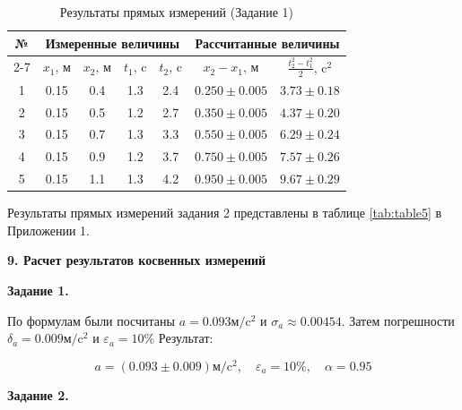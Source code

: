 \documentclass[14pt]{extreport}
\begin{document}
\begin{table}[H]
\centering
\caption{Результаты прямых измерений (Задание 1)}
\label{tab:table3}
\begin{tabular}{|c|c|c|c|c|c|c|}
\hline
№ & \multicolumn{4}{c|}{Измеренные величины} & \multicolumn{2}{c|}{Рассчитанные величины} \\
\cline{2-7} 
& \(x_1, \, \text{м}\) & \(x_2, \, \text{м}\) & \(t_1, \, \text{c}\) & \(t_2, \, \text{c}\) & \(x_2 - x_1, \, \text{м}\) & \(\frac{t_2^2 - t_1^2}{2}, \, \text{c}^2\) \\ \hline
1 & 0.15 & 0.4 & 1.3 & 2.4 & $0.250 \pm 0.005$ & $3.73 \pm 0.18$ \\ \hline
2 & 0.15 & 0.5 & 1.2 & 2.7 & $0.350 \pm 0.005$ & $4.37 \pm 0.20$ \\ \hline
3 & 0.15 & 0.7 & 1.3 & 3.3 & $0.550 \pm 0.005$ & $6.29 \pm 0.24$ \\ \hline
4 & 0.15 & 0.9 & 1.2 & 3.7 & $0.750 \pm 0.005$ & $7.57 \pm 0.26$ \\ \hline
5 & 0.15 & 1.1 & 1.3 & 4.2 & $0.950 \pm 0.005$ & $9.67 \pm 0.29$ \\ \hline

\end{tabular}
\end{table}

Результаты прямых измерений задания 2 представлены в таблице \ref{tab:table5} в Приложении 1.

\noindent\textbf{9. Расчет результатов косвенных измерений} 

\textbf{Задание 1.}

По формулам были посчитаны $a = 0.093\text{м}/\text{c}^2$ и $\sigma_a \approx 0.00454$.
Затем погрешности $\delta_a = 0.009\text{м}/\text{c}^2$ и $\varepsilon_a = 10\%$ Результат:

\begin{equation*}
a = (0.093 \pm 0.009)\text{м}/\text{c}^2, \quad \varepsilon_a = 10\%, \quad \alpha=0.95
\end{equation*}

\textbf{Задание 2.}
\end{document}
